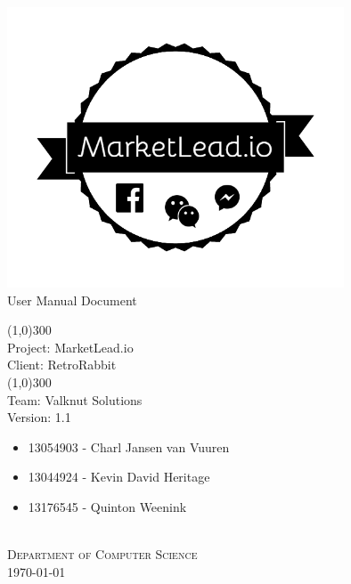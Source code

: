 \documentclass{article}
\begin{document}
	\begin{titlepage}
		\begin{center}
			\includegraphics[width=10cm]{images/logo.png}  \\
			[0.5cm]
			\huge{
			User Manual Document\\
			}
			
			\line(1,0){300}\\
			[0.2cm]
			\LARGE{Project: MarketLead.io\\
			Client: RetroRabbit} \\
			\line(1,0){300}\\
			\LARGE{Team: Valknut Solutions}\\
			[1.0cm]
			\large{Version: 1.1}\\
			[1.0cm]
			\large
			{
			\begin{itemize}
				\item 13054903 - Charl Jansen van Vuuren    
				\item 13044924 - Kevin David Heritage
				\item 13176545 - Quinton Weenink\\
			\end{itemize}
			}
			\textsc{\large}\\
		[3.0cm]
		\textsc{\large  Department of Computer Science}\\
		[0.5cm]
		\textsc{\large \today}\\
		\end{center}
	\end{titlepage}
	
	\cleardoublepage
	\begin{versionhistory}
	\end{versionhistory}	
	
\end{document}
